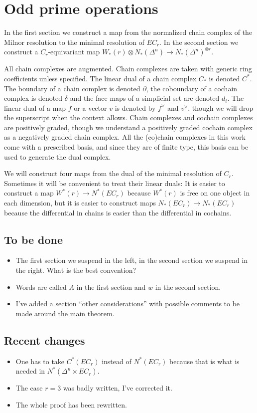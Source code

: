 
\section{Odd prime operations}

In the first section we construct a map from the normalized chain complex of the Milnor resolution to the minimal resolution of $EC_r$.
In the second section we construct a $C_r$-equivariant map $W_*(r)\otimes N_*(\Delta^n)\to N_*(\Delta^n)^{\otimes r}$.

All chain complexes are augmented. Chain complexes are taken with generic ring coefficients unless specified. The linear dual of a chain complex $C_*$ is denoted $C^*$. The boundary of a chain complex is denoted $\partial$, the coboundary of a cochain complex is denoted $\delta$ and the face maps of a simplicial set are denoted $d_i$. The linear dual of a map $f$ or a vector $v$ is denoted by $f^\vee$ and $v^\vee$, though we will drop the superscript when the context allows. Chain complexes and cochain complexes are positively graded, though we understand a positively graded cochain complex as a negatively graded chain complex. All the (co)chain complexes in this work come with a prescribed basis, and since they are of finite type, this basis can be used to generate the dual complex.

We will construct four maps from the dual of the minimal resolution of $C_r$. Sometimes it will be convenient to treat their linear duals: It is easier to construct a map $W^*(r)\to N^*(EC_r)$ because $W^*(r)$ is free on one object in each dimension, but it is easier to construct maps $N_*(EC_r)\to N_*(EC_r)$ because the differential in chains is easier than the differential in cochains.

\subsection*{To be done}
\begin{itemize}
	\item The first section we suspend in the left, in the second section we suspend in the right. What is the best convention?
	\item Words are called $A$ in the first section and $w$ in the second section.
	\item I've added a section ``other considerations'' with possible comments to be made around the main theorem.
\end{itemize}

\subsection*{Recent changes}
\begin{itemize}
	\item One has to take $C^*(EC_r)$ instead of $N^*(EC_r)$ because that is what is needed in $N^*(\Delta^n\times EC_r)$.
	\item The case $r=3$ was badly written, I've corrected it.
	\item The whole proof has been rewritten.
\end{itemize}
